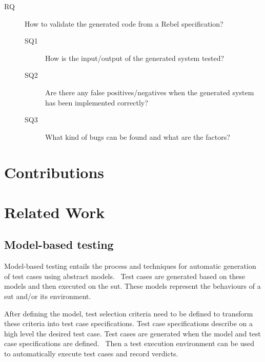 \begin{description}
  \item [RQ] How to validate the generated code from a Rebel specification?

  \begin{description}
    \item [SQ1] How is the input/output of the generated system tested?
    \item [SQ2] Are there any false positives/negatives when the generated
    system has been implemented correctly?
    \item [SQ3] What kind of bugs can be found and what are the factors?
  \end{description}

\end{description}

\section{Contributions}
%

\section{Related Work}

\subsection*{Model-based testing}

Model-based testing entails the process and techniques for automatic generation
of test cases using abstract models.~\cite{utting2012taxonomy, tretmans2008model, dalal1999model}
Test cases are generated based on these models and then executed on the
\gls{sut}. These models represent the behaviours of a \gls{sut} and/or its
environment.~\cite{utting2012taxonomy, tretmans2008model}

After defining the model, test selection criteria need to be defined to
transform these criteria into test case specifications. Test case specifications
describe on a high level the desired test case. Test cases are generated when
the model and test case specifications are defined.~\cite{utting2012taxonomy}
Then a test execution environment can be used to automatically execute test
cases and record verdicts.

